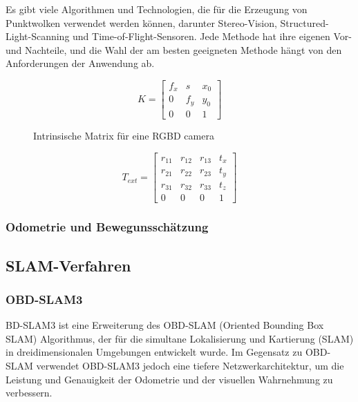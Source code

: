 Es gibt viele Algorithmen und Technologien, die für die Erzeugung von Punktwolken verwendet werden können, darunter Stereo-Vision, Structured-Light-Scanning und Time-of-Flight-Sensoren. Jede Methode hat ihre eigenen Vor- und Nachteile, und die Wahl der am besten geeigneten Methode hängt von den Anforderungen der Anwendung ab.



\begin{figure}
\begin{equation*}
    K = \begin{bmatrix}
    f_x & s & x_0 \\
    0 & f_y & y_0 \\
    0 & 0 & 1
    \end{bmatrix}
    \end{equation*}
    \caption{Intrinsische Matrix für eine RGBD camera}
\end{figure}

\begin{figure}
    \begin{equation*}
        T_{ext}=\begin{bmatrix}
            r_{11} & r_{12} & r_{13} & t_x\\
            r_{21} & r_{22} & r_{23} & t_y\\
            r_{31} & r_{32} & r_{33} & t_z\\
            0 & 0 & 0 & 1
            \end{bmatrix}   
    \end{equation*}
\end{figure}

\subsubsection{Odometrie und Bewegunsschätzung}


\subsection{SLAM-Verfahren}

\subsubsection{OBD-SLAM3}

BD-SLAM3 ist eine Erweiterung des OBD-SLAM (Oriented Bounding Box SLAM) Algorithmus, der für die simultane Lokalisierung und Kartierung (SLAM) in dreidimensionalen Umgebungen entwickelt wurde. Im Gegensatz zu OBD-SLAM verwendet OBD-SLAM3 jedoch eine tiefere Netzwerkarchitektur, um die Leistung und Genauigkeit der Odometrie und der visuellen Wahrnehmung zu verbessern.

